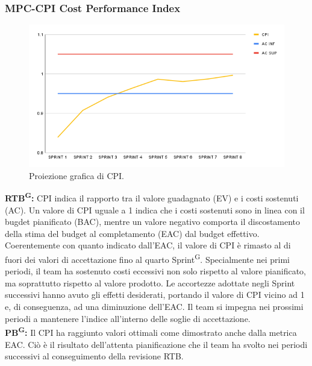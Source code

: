 \documentclass[8pt]{article}
\newcommand{\glossterm}[1]{#1\textsuperscript{G}} %
\begin{document}
\subsubsection{MPC-CPI Cost Performance Index}
\begin{figure}[h!]
    \centering
    \includegraphics[width=1\textwidth]{images_pdq/CPI.png}
    \caption{Proiezione grafica di CPI.}
    \label{fig:Proiezione grafica di CPI}
\end{figure}
\textbf{\glossterm{RTB}:} CPI indica il rapporto tra il valore guadagnato (EV) e i costi sostenuti (AC). Un valore di CPI uguale a 1 indica che i costi sostenuti sono in linea con il bugdet pianificato (BAC), mentre un valore negativo comporta il discostamento della stima del budget al completamento (EAC) dal budget effettivo.\\
Coerentemente con quanto indicato dall'EAC, il valore di CPI è rimasto al di fuori dei valori di accettazione fino al quarto \glossterm{Sprint}. Specialmente nei primi periodi, il team ha sostenuto costi eccessivi non solo rispetto al valore pianificato, ma soprattutto rispetto al valore prodotto. Le accortezze adottate negli Sprint successivi hanno avuto gli effetti desiderati, portando il valore di CPI vicino ad 1 e, di conseguenza, ad una diminuzione dell'EAC. Il team si impegna nei prossimi periodi a mantenere l'indice all'interno delle soglie di accettazione. \\
\textbf{\glossterm{PB}:} Il CPI ha raggiunto valori ottimali come dimostrato anche dalla metrica EAC. Ciò è il risultato dell'attenta pianificazione che il team ha svolto nei periodi successivi al conseguimento della revisione RTB.
\clearpage
\end{document}
